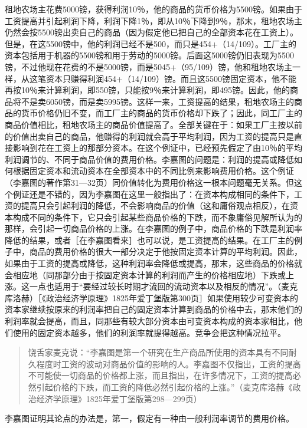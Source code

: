租地农场主花费5000镑，获得利润10％，他的商品的货币价格为5500镑。如果由于工资提高并引起利润下降，利润下降1％，即从10％下降到9％，那末，租地农场主仍然会按5500镑出卖自己的商品（因为假定他已把自己的全部资本花在工资上）。但是，在这5500镑中，他的利润已经不是500，而只是454+（14/109）。工厂主的资本包括用于机器的5500镑和用于劳动的5000镑。后面这5000镑仍旧表现为5500镑，不过他现在花费的不是5000镑，而是5045+（95/109）镑，他和租地农场主一样，从这笔资本只赚得利润454+（14/109）镑。而且这5500镑固定资本，他不能再按10％来计算利润，即550镑，只能按9％来计算利润，即495镑。因此，他的商品将不是卖6050镑，而是卖5995镑。这样一来，工资提高的结果，租地农场主的商品的货币价格仍旧不变，而工厂主的商品的货币价格却下跌了；因此，同工厂主的商品价值相比，租地农场主的商品价值提高了。全部关键在于：如果工厂主按以前的价值出卖自己的商品，他赚得的利润就会高于平均利润，因为工资的提高只是直接影响到花在工资上的那部分资本。在这个例证中，已经预先假定了由10％的平均利润调节的、不同于商品价值的费用价格。李嘉图的问题是：利润的提高或降低如何根据固定资本和流动资本在全部资本中的不同比例来影响费用价格。这个例证（李嘉图的著作第31—32页）同价值转化为费用价格这一根本问题毫无关系。但这个例证还是不错的，因为李嘉图在这里一般指出了：在资本构成相同的条件下，工资的提高只会引起利润的降低，不会影响商品的价值（这和庸俗观点相反），在资本构成不同的条件下，它只会引起某些商品价格的下跌，而不象庸俗见解所认为的那样，会引起一切商品价格的上涨。在李嘉图的例子中，商品价格的下跌是利润率降低的结果，或者［在李嘉图看来］也可以说，是工资提高的结果。在工厂主的例子中，商品的费用价格的很大一部分决定于他按固定资本计算的平均利润。因此，如果由于工资的提高或降低，这种利润率会降低或提高，那末，这些商品的价格就会相应地（同那部分由于按固定资本计算的利润而产生的价格相应地）下跌或上涨。这一点也适用于“要经过较长时期才流回的流动资本以及相反的情况”。（麦克库洛赫）［《政治经济学原理》1825年爱丁堡版第300页］如果使用较少可变资本的资本家继续按原来的利润率把自己的固定资本计算到商品的价格中去，那末他们的利润率就会提高，而且，同那些有较大部分资本由可变资本构成的资本家相比，他们使用的固定资本越多，他们的利润率就提得越高。竞争会把这种情况拉平。

\begin{quote}{饶舌家麦克说：“李嘉图是第一个研究在生产商品所使用的资本具有不同耐久程度时工资的波动对商品价值的影响的人。李嘉图不仅指出，工资的提高不可能使一切商品的价格都上涨，而且指出，在许多情况下，工资的提高必然引起价格的下跌，而工资的降低必然引起价格的上涨。”（麦克库洛赫《政治经济学原理》1825年爱丁堡版第298—299页）}\end{quote}

李嘉图证明其论点的办法是，第一，假定有一种由一般利润率调节的费用价格。

